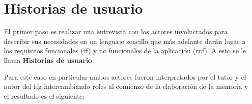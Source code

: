 \documentclass[11pt,spanish,listoffigures,listoftables]{tfgetsinf}
\begin{document}
\section{Historias de usuario}

El primer paso es realizar una entrevista con los actores involucrados para describir sus necesidades en un lenguaje sencillo que más adelante darán lugar a los requisitos funcionales (\acrshort{rf})  y no funcionales de la aplicación (\acrshort{rnf}). A esto se le llama \textbf{Historias de usuario}. \par

Para este caso en particular ambos actores fueron interpretados por el tutor y el autor del \acrshort{tfg} intercambiando roles al comienzo de la elaboración de la memoria y el resultado es el siguiente:
\end{document}
